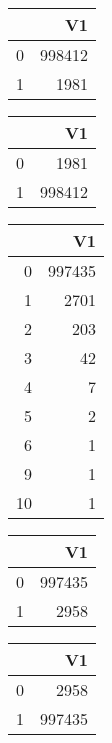\bigskip\bigskip
\centering
\begin{tabular}{rr}
  \hline
 & V1 \\ 
  \hline
0 & 998412 \\ 
  1 & 1981 \\ 
   \hline
\end{tabular}

\bigskip\bigskip
\centering
\begin{tabular}{rr}
  \hline
 & V1 \\ 
  \hline
0 & 1981 \\ 
  1 & 998412 \\ 
   \hline
\end{tabular}

\bigskip\bigskip
\centering
\begin{tabular}{rr}
  \hline
 & V1 \\ 
  \hline
0 & 997435 \\ 
  1 & 2701 \\ 
  2 & 203 \\ 
  3 &  42 \\ 
  4 &   7 \\ 
  5 &   2 \\ 
  6 &   1 \\ 
  9 &   1 \\ 
  10 &   1 \\ 
   \hline
\end{tabular}

\bigskip\bigskip
\centering
\begin{tabular}{rr}
  \hline
 & V1 \\ 
  \hline
0 & 997435 \\ 
  1 & 2958 \\ 
   \hline
\end{tabular}

\bigskip\bigskip
\centering
\begin{tabular}{rr}
  \hline
 & V1 \\ 
  \hline
0 & 2958 \\ 
  1 & 997435 \\ 
   \hline
\end{tabular}


